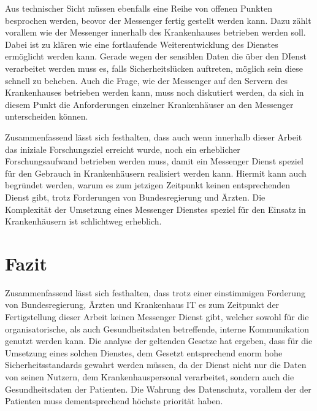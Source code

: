Aus technischer Sicht müssen ebenfalls eine Reihe von offenen Punkten besprochen werden, beovor der Messenger fertig gestellt werden kann.
Dazu zählt vorallem wie der Messenger innerhalb des Krankenhauses betrieben werden soll. Dabei ist zu klären wie eine fortlaufende Weiterentwicklung des Dienstes ermöglicht werden kann. Gerade wegen der sensiblen Daten die über den DIenst verarbeitet werden muss es, falls Sicherheitslücken auftreten, möglich sein diese schnell zu beheben. Auch die Frage, wie der Messenger auf den Servern des Krankenhauses betrieben werden kann, muss noch diskutiert werden, da sich in diesem Punkt die Anforderungen einzelner Krankenhäuser an den Messenger unterscheiden können.

Zusammenfassend lässt sich festhalten, dass auch wenn innerhalb dieser Arbeit das iniziale Forschungsziel erreicht wurde, noch ein erheblicher Forschungsaufwand betrieben werden muss, damit ein Messenger Dienst speziel für den Gebrauch in Krankenhäusern realisiert werden kann. Hiermit kann auch begründet werden, warum es zum jetzigen Zeitpunkt keinen entsprechenden Dienst gibt, trotz Forderungen von Bundesregierung und Ärzten. Die Komplexität der Umsetzung eines Messenger Dienstes speziel für den Einsatz in Krankenhäusern ist schlichtweg erheblich.

\section{Fazit}\label{chapter:fazit}
Zusammenfassend lässt sich festhalten, dass trotz einer einstimmigen Forderung von Bundesregierung, Ärzten und Krankenhaus IT es zum Zeitpunkt der Fertigstellung dieser Arbeit keinen Messenger Dienst gibt, welcher sowohl für die organisatorische, als auch Gesundheitsdaten betreffende, interne Kommunikation genutzt werden kann. Die analyse der geltenden Gesetze hat ergeben, dass für die Umsetzung eines solchen Dienstes, dem Gesetzt entsprechend enorm hohe Sicherheitsstandards gewahrt werden müssen, da der Dienst nicht nur die Daten von seinen Nutzern, dem Krankenhauspersonal verarbeitet, sondern auch die Gesundheitsdaten der Patienten. Die Wahrung des Datenschutz, vorallem der der Patienten muss dementsprechend höchste priorität haben. 

